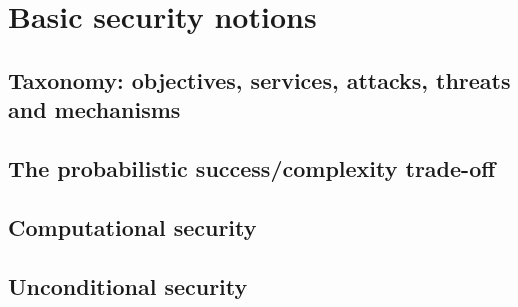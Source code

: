 \chapter{Basic security notions}
\section{Taxonomy: objectives, services, attacks, threats and mechanisms}
\section{The probabilistic success/complexity trade-off} 
\section{Computational security}
\section{Unconditional security}
